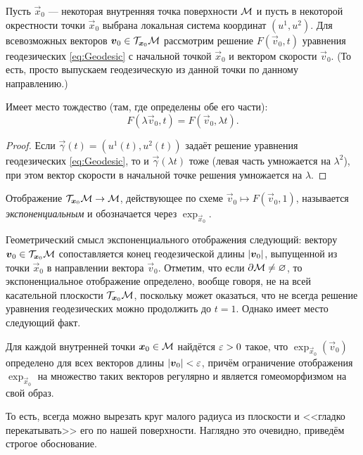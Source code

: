 Пусть $\vec{x}_0$ --- некоторая внутренняя точка поверхности $\mathcal{M}$ и пусть в некоторой окрестности точки $\vec{x}_0$ выбрана локальная система координат $(u^1, u^2)$. Для всевозможных векторов $\boldsymbol{v}_0 \in \mathcal{T}_{\boldsymbol{x}_0}\mathcal{M}$ рассмотрим решение $F(\vec{v}_0, t)$ уравнения геодезических \eqref{eq:Geodesic} с начальной точкой $\vec{x}_0$ и вектором скорости $\vec{v}_0$. (То есть, просто выпускаем геодезическую из данной точки по данному направлению.)

\begin{proposition}
	Имеет место тождество (там, где определены обе его части):
	\[
		F(\lambda\vec{v}_0, t) = F(\vec{v}_0, \lambda t).
	\]
\end{proposition}

\begin{proof}
	Если $\vec{\gamma}(t) = (u^1(t), u^2(t))$ задаёт решение уравнения геодезических \eqref{eq:Geodesic}, то и $\vec{\gamma}(\lambda t)$ тоже (левая часть умножается на $\lambda^2$), при этом вектор скорости в начальной точке решения умножается на $\lambda$.
\end{proof}

\begin{definition}
	Отображение $\mathcal{T}_{\boldsymbol{x}_0}\mathcal{M} \to \mathcal{M}$, действующее по схеме $\vec{v}_0 \mapsto F(\vec{v}_0, 1)$, называется \textit{экспоненциальным} и обозначается через $\exp_{\vec{x}_0}$.
\end{definition}

Геометрический смысл экспоненциального отображения следующий: вектору $\boldsymbol{v}_0 \in \mathcal{T}_{\boldsymbol{x}_0}\mathcal{M}$ сопоставляется конец геодезической длины $\left\lvert\boldsymbol{v}_0\right\rvert$, выпущенной из точки $\vec{x}_0$ в направлении вектора $\vec{v}_0$. Отметим, что если $\partial\mathcal{M} \ne \varnothing$, то экспоненциальное отображение определено, вообще говоря, не на всей касательной плоскости $\mathcal{T}_{\boldsymbol{x}_0}\mathcal{M}$, поскольку может оказаться, что не всегда решение уравнения геодезических можно продолжить до $t = 1$. Однако имеет место следующий факт.

\begin{theorem}
	Для каждой внутренней точки $\boldsymbol{x}_0 \in \mathcal{M}$ найдётся $\varepsilon > 0$ такое, что $\exp_{\vec{x}_0}(\vec{v}_0)$ определено для всех векторов длины $\left\lvert\boldsymbol{v}_0\right\rvert < \varepsilon$, причём ограничение отображения $\exp_{\vec{x}_0}$ на множество таких векторов регулярно и является гомеоморфизмом на свой образ.
\end{theorem}

То есть, всегда можно вырезать круг малого радиуса из плоскости и <<гладко перекатывать>> его по нашей поверхности. Наглядно это очевидно, приведём строгое обоснование.

